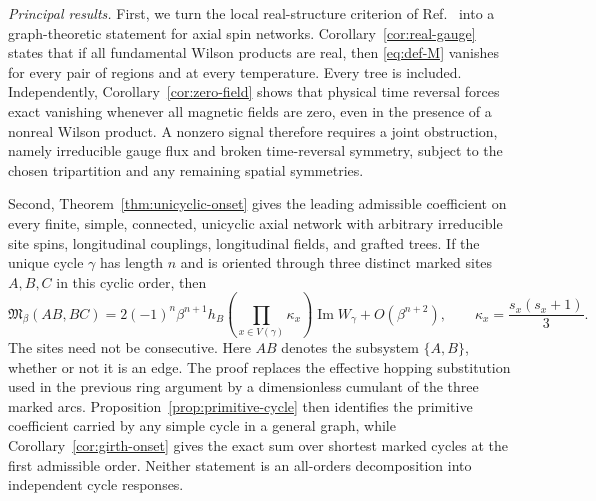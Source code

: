 \documentclass[11pt]{article}
\newcommand{\Mmod}{\mathfrak{M}}
\begin{document}
\textit{Principal results.}  First, we turn the local real-structure criterion
of Ref.~\cite{KimEtAl2022PRB} into a graph-theoretic statement for axial spin
networks.  Corollary~\ref{cor:real-gauge} states that if all fundamental Wilson
products are real, then \eqref{eq:def-M} vanishes for every pair of regions and
at every temperature.  Every tree is included.  Independently,
Corollary~\ref{cor:zero-field} shows that physical time reversal forces exact
vanishing whenever all magnetic fields are zero, even in the presence of a
nonreal Wilson product.  A nonzero signal therefore requires a joint
obstruction, namely irreducible gauge flux and broken time-reversal symmetry,
subject
to the chosen tripartition and any remaining spatial symmetries.

Second, Theorem~\ref{thm:unicyclic-onset} gives the leading admissible
coefficient on every finite, simple, connected, unicyclic axial network with
arbitrary irreducible site spins, longitudinal couplings, longitudinal fields,
and grafted trees.  If the unique cycle $\gamma$ has length $n$ and is
oriented through three distinct marked sites $A,B,C$ in this cyclic order,
then
\begin{equation}
 \Mmod_\beta(AB,BC)
 =2(-1)^n\beta^{n+1}h_B
 \left(\prod_{x\in V(\gamma)}\kappa_x\right)
 \operatorname{Im}W_\gamma+O(\beta^{n+2}),
 \qquad
 \kappa_x=\frac{s_x(s_x+1)}3.
 \label{eq:intro-unicyclic}
\end{equation}
The sites need not be consecutive.  Here $AB$ denotes the subsystem
$\{A,B\}$, whether or not it is an edge.  The proof replaces the effective
hopping substitution used in the previous ring argument by a dimensionless
cumulant of the three marked arcs.  Proposition~\ref{prop:primitive-cycle}
then identifies the primitive coefficient carried by any simple cycle in a
general graph, while Corollary~\ref{cor:girth-onset} gives the exact sum over
shortest marked cycles at the first admissible order.  Neither statement is
an all-orders decomposition into independent cycle responses.
\end{document}
